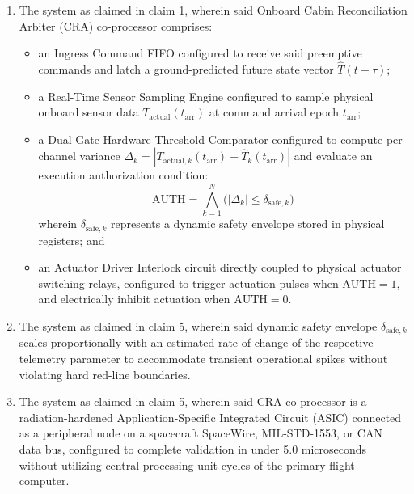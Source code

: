 \documentclass[12pt,a4paper]{article}
\begin{document}
\begin{enumerate}
    \item The system as claimed in claim 1, wherein said Onboard Cabin Reconciliation Arbiter (CRA) co-processor comprises:
    \begin{itemize}
        \item an Ingress Command FIFO configured to receive said preemptive commands and latch a ground-predicted future state vector $\hat{T}(t+\tau)$;
        \item a Real-Time Sensor Sampling Engine configured to sample physical onboard sensor data $T_{\text{actual}}(t_{\text{arr}})$ at command arrival epoch $t_{\text{arr}}$;
        \item a Dual-Gate Hardware Threshold Comparator configured to compute per-channel variance $\Delta_k = |T_{\text{actual},k}(t_{\text{arr}}) - \hat{T}_k(t_{\text{arr}})|$ and evaluate an execution authorization condition:
        \begin{equation*}
            \text{AUTH} = \bigwedge_{k=1}^N \bigl(|\Delta_k| \le \delta_{\text{safe},k}\bigr)
        \end{equation*}
        wherein $\delta_{\text{safe},k}$ represents a dynamic safety envelope stored in physical registers; and
        \item an Actuator Driver Interlock circuit directly coupled to physical actuator switching relays, configured to trigger actuation pulses when $\text{AUTH} = 1$, and electrically inhibit actuation when $\text{AUTH} = 0$.
    \end{itemize}

    \item The system as claimed in claim 5, wherein said dynamic safety envelope $\delta_{\text{safe},k}$ scales proportionally with an estimated rate of change of the respective telemetry parameter to accommodate transient operational spikes without violating hard red-line boundaries.

    \item The system as claimed in claim 5, wherein said CRA co-processor is a radiation-hardened Application-Specific Integrated Circuit (ASIC) connected as a peripheral node on a spacecraft SpaceWire, MIL-STD-1553, or CAN data bus, configured to complete validation in under 5.0 microseconds without utilizing central processing unit cycles of the primary flight computer.


\end{enumerate}
\end{document}
